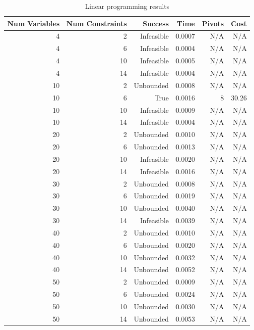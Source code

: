 \begin{table}[ht]
    \centering
    \begin{tabular}{rrrrrr}
        \toprule
        Num Variables & Num Constraints & Success & Time & Pivots & Cost \\
        \midrule
        4 & 2 & Infeasible & 0.0007 & N/A & N/A \\
		4 & 6 & Infeasible & 0.0004 & N/A & N/A \\
		4 & 10 & Infeasible & 0.0005 & N/A & N/A \\
		4 & 14 & Infeasible & 0.0004 & N/A & N/A \\
		10 & 2 & Unbounded & 0.0008 & N/A & N/A \\
		10 & 6 & True & 0.0016 & 8 & 30.26 \\
		10 & 10 & Infeasible & 0.0009 & N/A & N/A \\
		10 & 14 & Infeasible & 0.0004 & N/A & N/A \\
		20 & 2 & Unbounded & 0.0010 & N/A & N/A \\
		20 & 6 & Unbounded & 0.0013 & N/A & N/A \\
		20 & 10 & Infeasible & 0.0020 & N/A & N/A \\
		20 & 14 & Infeasible & 0.0016 & N/A & N/A \\
		30 & 2 & Unbounded & 0.0008 & N/A & N/A \\
		30 & 6 & Unbounded & 0.0019 & N/A & N/A \\
		30 & 10 & Unbounded & 0.0040 & N/A & N/A \\
		30 & 14 & Infeasible & 0.0039 & N/A & N/A \\
		40 & 2 & Unbounded & 0.0010 & N/A & N/A \\
		40 & 6 & Unbounded & 0.0020 & N/A & N/A \\
		40 & 10 & Unbounded & 0.0032 & N/A & N/A \\
		40 & 14 & Unbounded & 0.0052 & N/A & N/A \\
		50 & 2 & Unbounded & 0.0009 & N/A & N/A \\
		50 & 6 & Unbounded & 0.0024 & N/A & N/A \\
		50 & 10 & Unbounded & 0.0030 & N/A & N/A \\
		50 & 14 & Unbounded & 0.0053 & N/A & N/A \\
        \bottomrule
    \end{tabular}
    \caption{Linear programming results}
    \label{tab:lp-results}
\end{table}